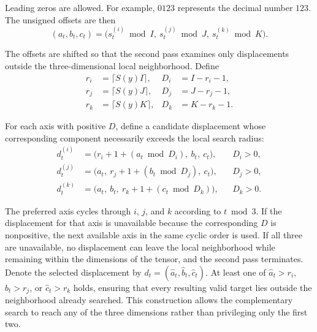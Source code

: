 \documentclass[12pt,a4paper]{article}
\begin{document}
\begin{enumerate}
	Leading zeros are allowed. For example, $0123$ represents the decimal number $123$. The unsigned offsets are then
	\begin{equation}
	(a_t,b_t,c_t)=\big(s_t^{(i)}\bmod I,\ s_t^{(j)}\bmod J,\ s_t^{(k)}\bmod K\big).
	\label{additional_connection_raw_offsets}
	\end{equation}

	The offsets are shifted so that the second pass examines only displacements outside the three-dimensional local neighborhood. Define
	\begin{equation}
	\begin{aligned}
	 r_i&=\lceil S(y)I\rceil, &D_i&=I-r_i-1,\\
	 r_j&=\lceil S(y)J\rceil, &D_j&=J-r_j-1,\\
	 r_k&=\lceil S(y)K\rceil, &D_k&=K-r_k-1.
	\end{aligned}
	\label{additional_connection_radii}
	\end{equation}

	For each axis with positive $D$, define a candidate displacement whose corresponding component necessarily exceeds the local search radius:
	\begin{equation}
	\begin{aligned}
	 d_t^{(i)}&=\big(r_i+1+(a_t\bmod D_i),\ b_t,\ c_t\big), &&D_i>0,\\
	 d_t^{(j)}&=\big(a_t,\ r_j+1+(b_t\bmod D_j),\ c_t\big), &&D_j>0,\\
	 d_t^{(k)}&=\big(a_t,\ b_t,\ r_k+1+(c_t\bmod D_k)\big), &&D_k>0.
	\end{aligned}
	\label{additional_connection_shifted_offsets}
	\end{equation}

	The preferred axis cycles through $i$, $j$, and $k$ according to $t\bmod 3$. If the displacement for that axis is unavailable because the corresponding $D$ is nonpositive, the next available axis in the same cyclic order is used. If all three are unavailable, no displacement can leave the local neighborhood while remaining within the dimensions of the tensor, and the second pass terminates. Denote the selected displacement by $d_t=(\widehat a_t,\widehat b_t,\widehat c_t)$. At least one of $\widehat a_t>r_i$, $\widehat b_t>r_j$, or $\widehat c_t>r_k$ holds, ensuring that every resulting valid target lies outside the neighborhood already searched. This construction allows the complementary search to reach any of the three dimensions rather than privileging only the first two.


\end{enumerate}
\end{document}
